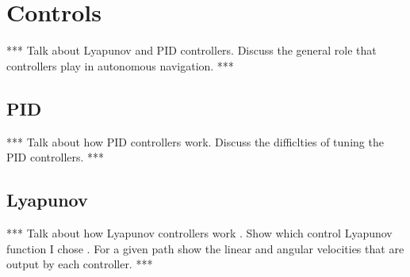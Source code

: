 \chapter{Controls}
\label{ch:controls}
*** Talk about Lyapunov and PID controllers. Discuss the general role that controllers play in autonomous navigation. ***

\section{PID}
\label{sec:pid}
*** Talk about how PID controllers work. Discuss the difficlties of tuning the PID controllers. ***

\section{Lyapunov}
\label{sec:lyapunov}
*** Talk about how Lyapunov controllers work \cite{Khalil02}. Show which control Lyapunov function I chose \cite{Rusu05RobotuxLyapunov}. For a given path show the linear and angular velocities that are output by each controller. ***